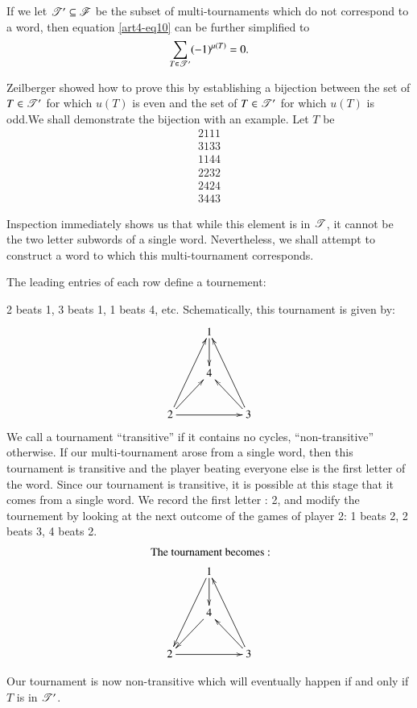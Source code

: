 If we let $\mathscr{T}' \subseteq \mathscr{F}$ be the subset of multi-tournaments which do not correspond to a word, then equation \eqref{art4-eq10} can be further simplified to
\begin{equation}
\sum\limits_{T \in \mathscr{T}'} (-1)^{\mu(T)} = 0. \label{art4-eq11}
\end{equation}

Zeilberger showed how to prove this by establishing a bijection between the set of $T \in \mathscr{T}'$ for which $u(T)$ is even and the set of $T \in \mathscr{T}'$ for which $u(T)$ is odd.\pageoriginale We shall demonstrate the bijection with an example. Let $T$ be 
\begin{align*}
2111\\
3133\\
1144\\
2232\\
2424\\
3443
\end{align*}

Inspection immediately shows us that while this element is in $\mathscr{T}$, it cannot be the two letter subwords of a single word. Nevertheless, we shall attempt to construct a word to which this multi-tournament corresponds.

The leading entries of each row define a tournement:

2 beats 1, 3 beats 1, 1 beats 4, etc. Schematically, this tournament is given by:
$$
\xymatrix{
& 1\ar[d] & \\
& 4 & \\
2\ar[uur] \ar[ur]\ar[rr] & & 3 \ar[uul]\ar[ul]
}
$$
We call a tournament ``transitive'' if it contains no cycles, ``non-transitive'' otherwise. If our multi-tournament arose from a single word, then this tournament is transitive and the player beating everyone else is the first letter of the word. Since our tournament is transitive, it is possible at this stage that it comes from a single word. We record the first letter : 2, and modify the tournement by looking at the next outcome of the games of player 2: 1 beats 2, 2 beats 3, 4 beats 2.
\begin{gather*}
\text{ The tournament becomes :}\\
\xymatrix{
& 1\ar[d] \ar[ddl] & \\
& 4\ar[dl] & \\
2\ar[rr] & & 3 \ar[uul]\ar[ul]
}
\end{gather*}

Our tournament is now non-transitive which will eventually happen if and only if $T$ is in $\mathscr{T}'$.

